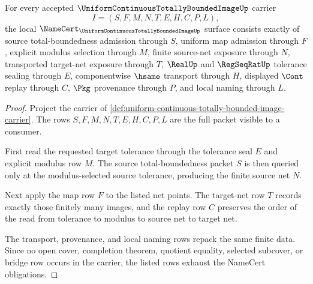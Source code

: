 \begin{theorem}
\label{thm:uniform-continuous-totally-bounded-image-namecert-obligations}
For every accepted $\UniformContinuousTotallyBoundedImageUp$ carrier
$$
I=(S,F,M,N,T,E,H,C,P,L),
$$
the local $\NameCert_{\UniformContinuousTotallyBoundedImageUp}$ surface consists exactly of source total-boundedness admission through $S$, uniform map admission through $F$, explicit modulus selection through $M$, finite source-net exposure through $N$, transported target-net exposure through $T$, $\RealUp$ and $\RegSeqRatUp$ tolerance sealing through $E$, componentwise $\hsame$ transport through $H$, displayed $\Cont$ replay through $C$, $\Pkg$ provenance through $P$, and local naming through $L$.
\end{theorem}
\begin{proof}
Project the carrier of \autoref{def:uniform-continuous-totally-bounded-image-carrier}. The rows $S,F,M,N,T,E,H,C,P,L$ are the full packet visible to a consumer.

First read the requested target tolerance through the tolerance seal $E$ and explicit modulus row $M$. The source total-boundedness packet $S$ is then queried only at the modulus-selected source tolerance, producing the finite source net $N$.

Next apply the map row $F$ to the listed net points. The target-net row $T$ records exactly those finitely many images, and the replay row $C$ preserves the order of the read from tolerance to modulus to source net to target net.

The transport, provenance, and local naming rows repack the same finite data. Since no open cover, completion theorem, quotient equality, selected subcover, or bridge row occurs in the carrier, the listed rows exhaust the NameCert obligations.
\end{proof}

